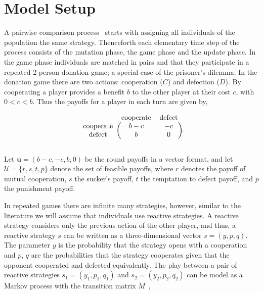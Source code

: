 \documentclass[11pt]{article}
\theoremstyle{plainCl1}
\theoremstyle{plainCl2}
\begin{document}
\section{Model Setup}\label{section:model}

A pairwise comparison process~\cite{traulsen2007pairwise} starts with assigning all
individuals of the population the same strategy. Thenceforth each elementary time step of
the process consists of the mutation phase, the game phase and the update phase.
In the game phase individuals are matched in pairs and that they participate in
a repeated 2 person donation game; a special case of the prisoner's dilemma. In
the donation game there are two actions: cooperation (\(C\)) and defection
(\(D\)). By cooperating a player provides a benefit \(b\) to the other player at
their cost \(c\), with \(0 < c < b\). Thus the payoffs for a player in each turn
are given by,

\begin{equation}
    \begin{blockarray}{ccc}
        & \text{cooperate} & \text{defect} \\
        \begin{block}{c(cc)}
            \text{cooperate} & b - c & -c \\
            \text{defect} & b & 0 \\
        \end{block}
    \end{blockarray}.
\end{equation}

Let \(\mathbf{u} = (b-c, -c, b, 0)\) be the round payoffs in a vector format, and let
\(\mathcal{U} = \{r, s, t, p\}\) denote the set of feasible payoffs, where \(r\)
denotes the payoff of mutual cooperation, \(s\) the sucker's payoff, \(t\) the
temptation to defect payoff, and \(p\) the punishment payoff.

In repeated games there are infinite many strategies, however, similar to the
literature we will assume that individuals use reactive strategies. A reactive
strategy considers only the previous action of the other player, and thus, a
reactive strategy \(s\) can be written as a three-dimensional vector \(s=(y, p,
q)\). The parameter \(y\) is the probability that the strategy opens with a
cooperation and \(p\), \(q\) are the probabilities that the strategy cooperates
given that the opponent cooperated and defected equivalently. The play between a
pair of reactive strategies $s_1 = (y_1, p_1, q_1)$ and $s_2 = (y_2, p_2, q_2)$
can be model as a Markov process with the transition matrix \(M\)~\cite{nowak:APC:1989},
\end{document}
